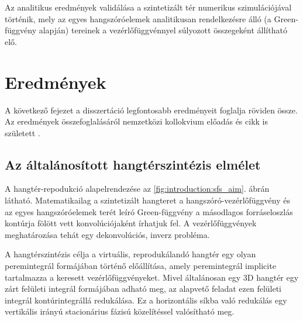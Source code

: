 \documentclass[10pt,twoside]{article}
\theoremstyle{thesisgroupstyle}
\theoremstyle{indented}
\begin{document}
Az analitikus eredmények validálása a szintetizált tér numerikus szimulációjával történik, mely az egyes hangszóróelemek analitikusan rendelkezésre álló (a Green-függvény alapján) tereinek a vezérlőfüggvénnyel súlyozott összegeként állítható elő. 

\section{Eredmények}

A következő fejezet a disszertáció legfontosabb eredményeit foglalja röviden össze.
Az eredmények összefoglalásáról nemzetközi kollokvium előadás és cikk is született \cite{Firtha2019:daga_booklet}.

\subsection{Az általánosított hangtérszintézis elmélet}

A hangtér-repodukció alapelrendezése az \ref{fig:introduction:sfs_aim}. ábrán látható.
Matematikailag a szintetizált hangteret a hangszóró-vezérlőfüggvény és az egyes hangszóróelemek terét leíró Green-függvény a másodlagos forráseloszlás kontúrja fölött vett konvolúciójaként írhatjuk fel.
A vezérlőfüggvények meghatározása tehát egy dekonvolúciós, inverz probléma.

A hangtérszintézis célja a virtuális, reprodukálandó hangtér egy olyan peremintegrál formájában történő előállítása, amely peremintegrál implicite tartalmazza a keresett vezérlőfüggvényeket.
Mivel általánosan egy 3D hangtér egy zárt felületi integrál formájában adható meg, az alapvető feladat ezen felületi integrál kontúrintegrállá redukálása.
Ez a horizontális síkba való redukálás egy vertikális irányú stacionárius fázisú közelítéssel valósítható meg.
\end{document}
